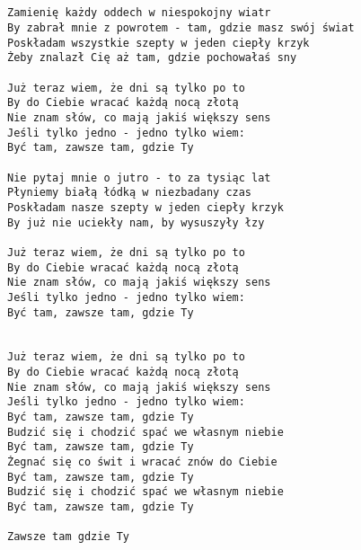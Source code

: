 \documentclass[12pt]{article}
\begin{document}
\subsection*{}
\begin{verbatim}
Zamienię każdy oddech w niespokojny wiatr
By zabrał mnie z powrotem - tam, gdzie masz swój świat
Poskładam wszystkie szepty w jeden ciepły krzyk
Żeby znalazł Cię aż tam, gdzie pochowałaś sny

Już teraz wiem, że dni są tylko po to
By do Ciebie wracać każdą nocą złotą
Nie znam słów, co mają jakiś większy sens
Jeśli tylko jedno - jedno tylko wiem:
Być tam, zawsze tam, gdzie Ty

Nie pytaj mnie o jutro - to za tysiąc lat
Płyniemy białą łódką w niezbadany czas
Poskładam nasze szepty w jeden ciepły krzyk
By już nie uciekły nam, by wysuszyły łzy

Już teraz wiem, że dni są tylko po to
By do Ciebie wracać każdą nocą złotą
Nie znam słów, co mają jakiś większy sens
Jeśli tylko jedno - jedno tylko wiem:
Być tam, zawsze tam, gdzie Ty


Już teraz wiem, że dni są tylko po to
By do Ciebie wracać każdą nocą złotą
Nie znam słów, co mają jakiś większy sens
Jeśli tylko jedno - jedno tylko wiem:
Być tam, zawsze tam, gdzie Ty
Budzić się i chodzić spać we własnym niebie
Być tam, zawsze tam, gdzie Ty
Żegnać się co świt i wracać znów do Ciebie
Być tam, zawsze tam, gdzie Ty
Budzić się i chodzić spać we własnym niebie
Być tam, zawsze tam, gdzie Ty

Zawsze tam gdzie Ty
\end{verbatim}
\clearpage
\end{document}
